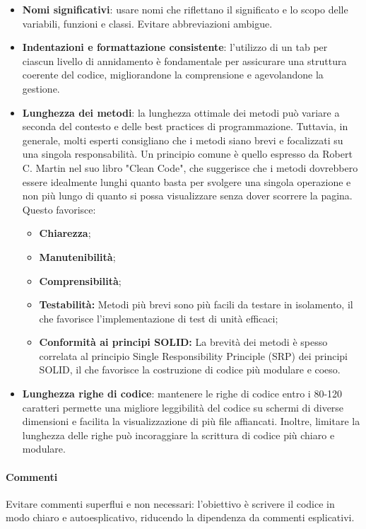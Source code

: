 \begin{itemize}
    \item \textbf{Nomi significativi}: usare nomi che riflettano il significato e lo scopo delle variabili, funzioni e classi. Evitare abbreviazioni ambigue.
    \item \textbf{Indentazioni e formattazione consistente}: l'utilizzo di un tab per ciascun livello di annidamento è fondamentale per assicurare una struttura coerente del codice, migliorandone la comprensione e agevolandone la gestione.
    \item \textbf{Lunghezza dei metodi}: la lunghezza ottimale dei metodi può variare a seconda del contesto e delle best practices di programmazione. Tuttavia, in generale, molti esperti consigliano che i metodi siano brevi e focalizzati su una singola responsabilità. Un principio comune è quello espresso da Robert C. Martin nel suo libro "Clean Code", che suggerisce che i metodi dovrebbero essere idealmente lunghi quanto basta per svolgere una singola operazione e non più lungo di quanto si possa visualizzare senza dover scorrere la pagina. \\
    Questo favorisce:
    \begin{itemize}
        \item \textbf{Chiarezza};
        \item \textbf{Manutenibilità};
        \item \textbf{Comprensibilità};
        \item \textbf{Testabilità:} Metodi più brevi sono più facili da testare in isolamento, il che favorisce l'implementazione di test di unità efficaci;
        \item \textbf{Conformità ai principi SOLID:} La brevità dei metodi è spesso correlata al principio Single Responsibility Principle (SRP) dei principi SOLID, il che favorisce la costruzione di codice più modulare e coeso.
    \end{itemize} 
    \item \textbf{Lunghezza righe di codice}: mantenere le righe di codice entro i 80-120 caratteri permette una migliore leggibilità del codice su schermi di diverse dimensioni e facilita la visualizzazione di più file affiancati. Inoltre, limitare la lunghezza delle righe può incoraggiare la scrittura di codice più chiaro e modulare.
\end{itemize}

\paragraph{Commenti}
Evitare commenti superflui e non necessari: l'obiettivo è scrivere il codice in modo chiaro e autoesplicativo, riducendo la dipendenza da commenti esplicativi.

